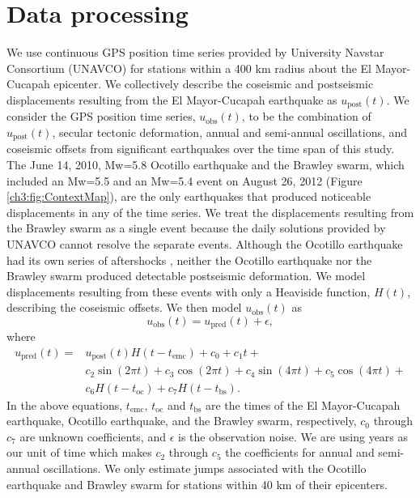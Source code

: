 \section{Data processing}\label{ch3:sec:Data}
We use continuous GPS position time series provided by University Navstar Consortium (UNAVCO) for stations within a 400 km radius about the El Mayor-Cucapah epicenter. We collectively describe the coseismic and postseismic displacements resulting from the El Mayor-Cucapah earthquake as $u_\mathrm{post}(t)$.  We consider the GPS position time series, $u_\mathrm{obs}(t)$, to be the combination of $u_\mathrm{post}(t)$, secular tectonic deformation, annual and semi-annual oscillations, and coseismic offsets from significant earthquakes over the time span of this study.  The June 14, 2010, Mw=5.8 Ocotillo earthquake and the Brawley swarm, which included an Mw=5.5 and an Mw=5.4 event on August 26, 2012 (Figure \ref{ch3:fig:ContextMap}), are the only earthquakes that produced noticeable displacements in any of the time series.  We treat the displacements resulting from the Brawley swarm as a single event because the daily solutions provided by UNAVCO cannot resolve the separate events.  Although the Ocotillo earthquake had its own series of aftershocks \citep{Hauksson2011}, neither the Ocotillo earthquake nor the Brawley swarm produced detectable postseismic deformation.  We model displacements resulting from these events with only a Heaviside function, $H(t)$, describing the coseismic offsets.  We then model $u_\mathrm{obs}(t)$ as 
\begin{equation}
  u_\mathrm{obs}(t) = u_\mathrm{pred}(t) + \epsilon,
\end{equation}
where
\begin{equation}\label{TimeSeriesModel}
  \begin{split}  
    u_\mathrm{pred}(t) = &u_\mathrm{post}(t)H(t-t_\mathrm{emc}) + c_0 + c_1t + \\
                         &c_2\sin(2\pi t) + c_3\cos(2\pi t) + c_4\sin(4\pi t) + c_5\cos(4\pi t) + \\
                         &c_6H(t-t_\mathrm{oc}) + c_7H(t-t_\mathrm{bs}).
  \end{split}
\end{equation}
In the above equations, $t_\mathrm{emc}$, $t_\mathrm{oc}$ and $t_\mathrm{bs}$ are the times of the El Mayor-Cucapah earthquake, Ocotillo earthquake, and the Brawley swarm, respectively, $c_0$ through $c_7$ are unknown coefficients, and $\epsilon$ is the observation noise.  We are using years as our unit of time which makes $c_2$ through $c_5$ the coefficients for annual and semi-annual oscillations.  We only estimate jumps associated with the Ocotillo earthquake and Brawley swarm for stations within 40 km of their epicenters. 

